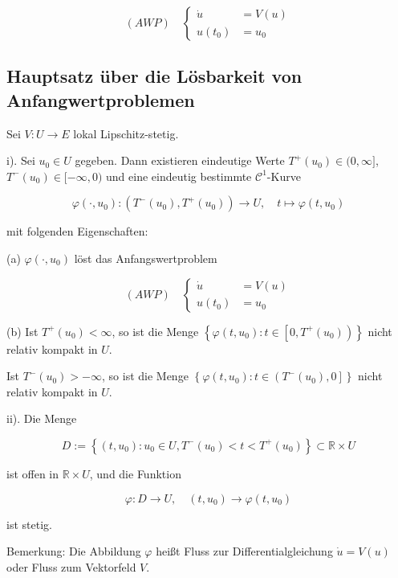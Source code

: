 \documentclass[10pt, letterpaper]{article}
\begin{document}
$$
(A W P) \quad\left\{\begin{aligned}
\dot{u} & =V(u) \\
u\left(t_{0}\right) & =u_{0}
\end{aligned}\right.
$$

\subsection*{Hauptsatz über die Lösbarkeit von Anfangwertproblemen}

Sei $V: U \rightarrow E$ lokal Lipschitz-stetig.

i). Sei $u_{0} \in U$ gegeben. Dann existieren eindeutige Werte $T^{+}\left(u_{0}\right) \in(0, \infty]$, $T^{-}\left(u_{0}\right) \in[-\infty, 0)$ und eine eindeutig bestimmte $\mathcal{C}^{1}$-Kurve

$$
\varphi\left(\cdot, u_{0}\right):\left(T^{-}\left(u_{0}\right), T^{+}\left(u_{0}\right)\right) \rightarrow U, \quad t \mapsto \varphi\left(t, u_{0}\right)
$$

mit folgenden Eigenschaften:

(a) $\varphi\left(\cdot, u_{0}\right)$ löst das Anfangswertproblem

$$
(A W P) \quad\left\{\begin{aligned}
\dot{u} & =V(u) \\
u\left(t_{0}\right) & =u_{0}
\end{aligned}\right.
$$

(b) Ist $T^{+}\left(u_{0}\right)<\infty$, so ist die Menge $\left\{\varphi\left(t, u_{0}\right): t \in\left[0, T^{+}\left(u_{0}\right)\right)\right\}$ nicht relativ kompakt in $U$.

Ist $T^{-}\left(u_{0}\right)>-\infty$, so ist die Menge $\left\{\varphi\left(t, u_{0}\right): t \in\left(T^{-}\left(u_{0}\right), 0\right]\right\}$ nicht relativ kompakt in $U$.

ii). Die Menge

$$
D:=\left\{\left(t, u_{0}\right): u_{0} \in U, T^{-}\left(u_{0}\right)<t<T^{+}\left(u_{0}\right)\right\} \subset \mathbb{R} \times U
$$

ist offen in $\mathbb{R} \times U$, und die Funktion

$$
\varphi: D \rightarrow U, \quad\left(t, u_{0}\right) \rightarrow \varphi\left(t, u_{0}\right)
$$

ist stetig.

Bemerkung: Die Abbildung $\varphi$ heißt Fluss zur Differentialgleichung $\dot{u}=V(u)$ oder Fluss zum Vektorfeld $V$.
\end{document}
